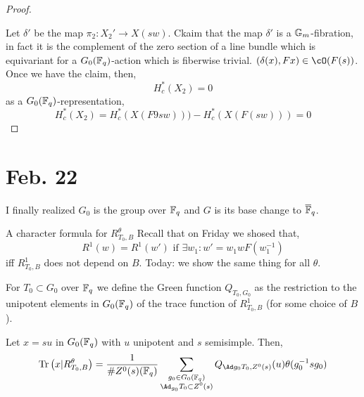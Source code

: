 \documentclass[12pt]{article}
\begin{document}
\begin{proof}
\begin{center}
\end{center}
Let $\delta'$ be the map $\pi_2 : X_2' \to X(sw)$. Ckaim that the map $\delta'$ is a ${\mathbb{G}_m}$-fibration, in fact it is the complement of the zero section of a line bundle which is equivariant for a $G_0(\mathbb{F}_q)$-action which is fiberwise trivial. $(\delta(x), F x) \in \cO(F(s))$. Once we have the claim, then,
\[ H^*_c(X_2) = 0 \]
as a $G_0(\mathbb{F}_q)$-representation,
\[ H_c^*(X_2) = H^*_c(X(F9sw))) - H^*_c(X(F(sw))) = 0 \]
\end{proof}

\section{Feb. 22}

\begin{rmk}
I finally realized $G_0$ is the group over $\mathbb{F}_q$ and $G$ is its base change to $\overline{\mathbb{F}}_q$.
\end{rmk}

A character formula for $R^\theta_{T_0, B}$ Recall that on Friday we shosed that,
\[ R^1(w) = R^1(w') \text{ if } \exists w_1 : w' = w_1 w F(w_1^{-1}) \]
iff $R^1_{T_0,B}$ does not depend on $B$. Today: we show the same thing for all $\theta$. 

\begin{defn}
For $T_0 \subset G_0$ over $\mathbb{F}_q$ we define the Green function $Q_{T_0, G_0}$ as the restriction to the unipotent elements in $G_0(\mathbb{F}_q)$ of the trace function of $R^1_{T_0, B}$ (for some choice of $B$). 
\end{defn}

\begin{theorem}
Let $x = su$ in $G_0(\mathbb{F}_q)$ with $u$ unipotent and $s$ semisimple. Then,
\[ \Tr{x | R^\theta_{T_0, B}} = \frac{1}{\# Z^0(s)(\FF_q)} \sum_{\substack{ g_0 \in G_0(\FF_q) \\ \Ad_{g_0} T_0 \subset Z^0(s)}} Q_{\Ad g_0 T_0, Z^0(s)}(u) \theta(g_0^{-1} s g_0) \]
\end{theorem}
\end{document}
